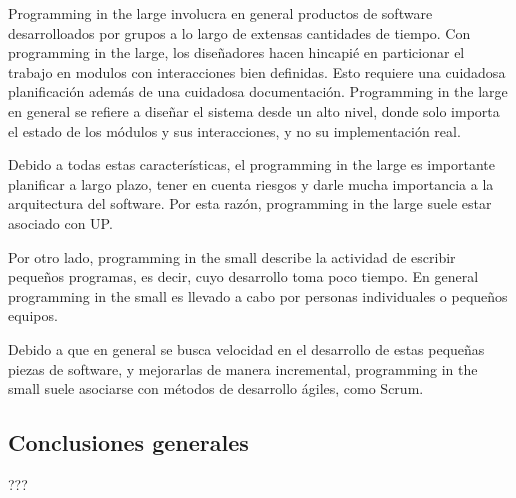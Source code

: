 Programming in the large involucra en general productos de software desarrolloados por grupos a lo largo de extensas cantidades de tiempo. Con programming in the large, los diseñadores hacen hincapié en particionar el trabajo en modulos con interacciones bien definidas. Esto requiere una cuidadosa planificación además de una cuidadosa documentación. Programming in the large en general se refiere a diseñar el sistema desde un alto nivel, donde solo importa el estado de los módulos y sus interacciones, y no su implementación real.

Debido a todas estas características, el programming in the large es importante planificar a largo plazo, tener en cuenta riesgos y darle mucha importancia a la arquitectura del software. Por esta razón, programming in the large suele estar asociado con UP.

Por otro lado, programming in the small describe la actividad de escribir pequeños programas, es decir, cuyo desarrollo toma poco tiempo. En general programming in the small es llevado a cabo por personas individuales o pequeños equipos.

Debido a que en general se busca velocidad en el desarrollo de estas pequeñas piezas de software, y mejorarlas de manera incremental, programming in the small suele asociarse con métodos de desarrollo ágiles, como Scrum.

\subsection{Conclusiones generales}

???
